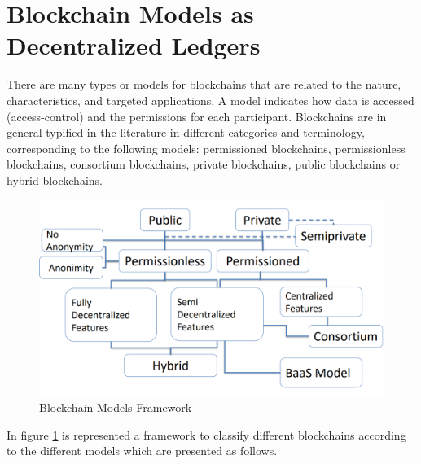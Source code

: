 \section{Blockchain Models as Decentralized Ledgers}
\label{sec:background:blockchain_models}

There are many types or models for blockchains that are related to the nature, characteristics, and targeted applications. A model indicates how data is accessed (access-control) and the permissions for each participant. Blockchains are in general typified in the literature in different categories and terminology, corresponding to the following models: permissioned blockchains, permissionless blockchains, consortium blockchains, private blockchains, public blockchains or hybrid blockchains. %


\begin{figure}[h]
    \centering
    \includegraphics[scale=0.3]{Chapters/Figures/blockchain_models_framework.png}
    \caption{Blockchain Models Framework}
    \label{fig:blockchain_models_framework}
\end{figure}

In figure \ref{fig:blockchain_models_framework} is represented a framework to classify different blockchains according to the different models \cite{systematic_survey_blockchain_systems} which are presented as follows. %



